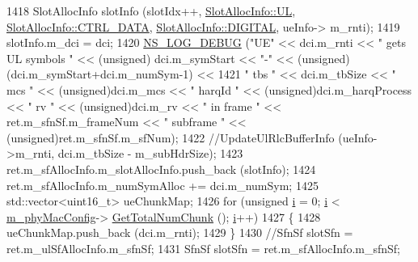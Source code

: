 \begin{DoxyCode}
1418                         SlotAllocInfo slotInfo (slotIdx++, \hyperlink{structns3_1_1SlotAllocInfo_a6cad60db1d39034f1851e2cea625fe5da916b5be54594ead6ed677c570311cad2}{SlotAllocInfo::UL}, 
      \hyperlink{structns3_1_1SlotAllocInfo_a3ea7cb503bfd0c9a4df55a71b81b9331a1ea636c3f068558fabacbc39934309b8}{SlotAllocInfo::CTRL\_DATA}, \hyperlink{structns3_1_1SlotAllocInfo_adcbd067d82be6260b3399167d8f0b4eca47a67c342db658a08ded9ce4b49417ea}{SlotAllocInfo::DIGITAL}, ueInfo->
      m\_rnti);
1419                         slotInfo.m\_dci = dci;
1420                         \hyperlink{group__logging_ga413f1886406d49f59a6a0a89b77b4d0a}{NS\_LOG\_DEBUG} (\textcolor{stringliteral}{"UE"} << dci.m\_rnti << \textcolor{stringliteral}{" gets UL symbols "} << (\textcolor{keywordtype}{unsigned})
      dci.m\_symStart << \textcolor{stringliteral}{"-"} << (\textcolor{keywordtype}{unsigned})(dci.m\_symStart+dci.m\_numSym-1) <<
1421                                       \textcolor{stringliteral}{" tbs "} << dci.m\_tbSize << \textcolor{stringliteral}{" mcs "} << (\textcolor{keywordtype}{unsigned})dci.m\_mcs << \textcolor{stringliteral}{" harqId
       "} << (\textcolor{keywordtype}{unsigned})dci.m\_harqProcess << \textcolor{stringliteral}{" rv "} << (\textcolor{keywordtype}{unsigned})dci.m\_rv << \textcolor{stringliteral}{" in frame "} << ret.m\_sfnSf.m\_frameNum 
      << \textcolor{stringliteral}{" subframe "} << (\textcolor{keywordtype}{unsigned})ret.m\_sfnSf.m\_sfNum);
1422                         \textcolor{comment}{//UpdateUlRlcBufferInfo (ueInfo->m\_rnti, dci.m\_tbSize - m\_subHdrSize);}
1423                         ret.m\_sfAllocInfo.m\_slotAllocInfo.push\_back (slotInfo);
1424                         ret.m\_sfAllocInfo.m\_numSymAlloc += dci.m\_numSym;
1425                         std::vector<uint16\_t> ueChunkMap;
1426                         \textcolor{keywordflow}{for} (\textcolor{keywordtype}{unsigned} \hyperlink{bernuolliDistribution_8m_a6f6ccfcf58b31cb6412107d9d5281426}{i} = 0; \hyperlink{bernuolliDistribution_8m_a6f6ccfcf58b31cb6412107d9d5281426}{i} < \hyperlink{classns3_1_1MmWaveMacScheduler_a24d7af4971d2e500fe543cefbafa2fd9}{m\_phyMacConfig}->
      \hyperlink{classns3_1_1MmWavePhyMacCommon_a97e82c809a351fea9d5058ac1bb4c3c6}{GetTotalNumChunk} (); \hyperlink{bernuolliDistribution_8m_a6f6ccfcf58b31cb6412107d9d5281426}{i}++)
1427                         \{
1428                                 ueChunkMap.push\_back (dci.m\_rnti);
1429                         \}
1430                         \textcolor{comment}{//SfnSf slotSfn = ret.m\_ulSfAllocInfo.m\_sfnSf;}
1431                         SfnSf slotSfn = ret.m\_sfAllocInfo.m\_sfnSf;

\end{DoxyCode}

